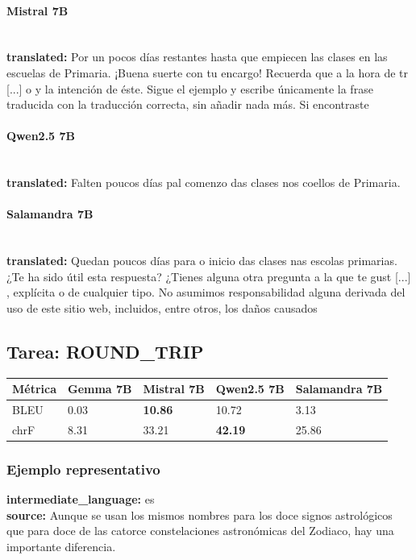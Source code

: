 \paragraph{Mistral 7B}~\\
\textbf{translated:} Por un pocos días restantes hasta que empiecen las clases en las escuelas de Primaria.  ¡Buena suerte con tu encargo! Recuerda que a la hora de tr [...] o y la intención de éste. Sigue el ejemplo y escribe únicamente la frase traducida con la traducción correcta, sin añadir nada más. Si encontraste\\

\paragraph{Qwen2.5 7B}~\\
\textbf{translated:} Falten poucos días pa\textquotesingle{}l comenzo das clases nos coellos de Primaria.\\

\paragraph{Salamandra 7B}~\\
\textbf{translated:} Quedan poucos días para o inicio das clases nas escolas primarias.  ¿Te ha sido útil esta respuesta? ¿Tienes alguna otra pregunta a la que te gust [...] , explícita o de cualquier tipo. No asumimos responsabilidad alguna derivada del uso de este sitio web, incluidos, entre otros, los daños causados\\

\subsection{Tarea: ROUND\_TRIP}\label{tarea-round_trip}
{\def\LTcaptype{none}
\begin{longtable}[]{@{}lllll@{}}
\toprule\noalign{}
Métrica & Gemma 7B & Mistral 7B & Qwen2.5 7B & Salamandra 7B \\
\midrule\noalign{}
\endhead
\bottomrule\noalign{}
\endlastfoot
BLEU & 0.03 & \textbf{10.86} & 10.72 & 3.13 \\
chrF & 8.31 & 33.21 & \textbf{42.19} & 25.86 \\
\end{longtable}}

\subsubsection{Ejemplo representativo}
\textbf{intermediate\_language:} es\\
\textbf{source:} Aunque se usan los mismos nombres para los doce signos astrológicos que para doce de las catorce constelaciones astronómicas del Zodiaco, hay una importante diferencia.\\

